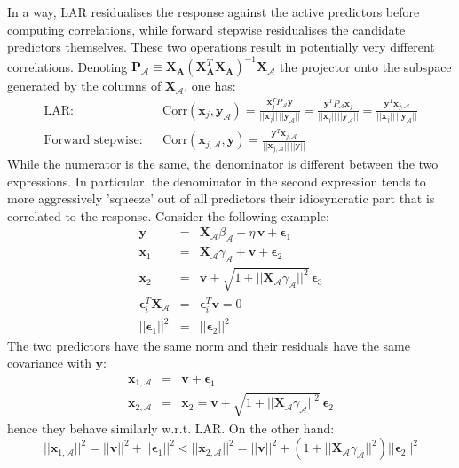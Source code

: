 In a way, LAR residualises the response against the active predictors 
before computing correlations, while forward stepwise residualises the candidate
predictors themselves. These two operations result in potentially very different
correlations. Denoting $\mathbf{P}_\mathcal{A} \equiv \mathbf{X}_\mathbf{A} 
\left(\mathbf{X}_\mathbf{A}^T \mathbf{X}_\mathbf{A}\right)^{-1} 
\mathbf{X}_\mathcal{A}$ the projector onto the subspace generated by the
columns of $\mathbf{X}_\mathcal{A}$, one has:
\begin{eqnarray*}
\textrm{LAR}: & & \textrm{Corr} \left(\mathbf{x}_j, \mathbf{y}_{\mathcal{A}}\right) =
    \frac{\mathbf{x}_j^T P_\mathcal{A} \mathbf{y}}{
        ||\mathbf{x}_j||\,||\mathbf{y}_{\mathcal{A}}||} = 
    \frac{\mathbf{y}^T P_\mathcal{A}\mathbf{x}_j}{
        ||\mathbf{x}_j||\,||\mathbf{y}_{\mathcal{A}}||} = 
    \frac{\mathbf{y}^T \mathbf{x}_{j, \mathcal{A}}}{
        ||\mathbf{x}_j||\,||\mathbf{y}_{\mathcal{A}}||} \\
\textrm{Forward stepwise}: & &
    \textrm{Corr} \left(\mathbf{x}_{j, \mathcal{A}}, \mathbf{y}\right) = 
        \frac{\mathbf{y}^T \mathbf{x}_{j, \mathcal{A}}}{
            ||\mathbf{x}_{j, \mathcal{A}}||\,||\mathbf{y}||}
\end{eqnarray*}
While the numerator is the same, the denominator is different between
the two expressions. In particular, the denominator in the second expression
tends to more aggressively 'squeeze' out of all predictors their idiosyncratic
part that is correlated to the response. Consider the following example:
\begin{eqnarray*}
    \mathbf{y} & = & \mathbf{X}_\mathcal{A} \beta_\mathcal{A} + \eta\, \mathbf{v} + \bm{\epsilon}_1 \\
    \mathbf{x}_1 & = & \mathbf{X}_\mathcal{A} \gamma_\mathcal{A} + \mathbf{v} + \bm{\epsilon}_2 \\
    \mathbf{x}_2 & = & \mathbf{v} + \sqrt{1 + ||\mathbf{X}_\mathcal{A} \gamma_\mathcal{A}||^2}\,\bm{\epsilon}_3 \\
    \bm{\epsilon}_i^T \mathbf{X}_\mathcal{A} & = & \bm{\epsilon}_i^T \mathbf{v} = 0\\
    ||\bm{\epsilon}_1||^2 & = & ||\bm{\epsilon}_2||^2
\end{eqnarray*}
The two predictors have the same norm and their residuals have the same
covariance with $\mathbf{y}$:
\begin{eqnarray*}
    \mathbf{x}_{1, \mathcal{A}} & = & \mathbf{v} + \bm{\epsilon}_1 \\
    \mathbf{x}_{2, \mathcal{A}} & = & \mathbf{x}_{2} = \mathbf{v} + \sqrt{1 + ||\mathbf{X}_\mathcal{A} \gamma_\mathcal{A}||^2}\,\bm{\epsilon}_2
\end{eqnarray*}
hence they behave similarly w.r.t. LAR. On the other hand:
\begin{equation*}
||\mathbf{x}_{1, \mathcal{A}}||^2 = ||\mathbf{v}||^2 + ||\bm{\epsilon}_1||^2 < ||\mathbf{x}_{2, \mathcal{A}}||^2 = ||\mathbf{v}||^2 + \left(1 + ||\mathbf{X}_\mathcal{A} \gamma_\mathcal{A}||^2\right) ||\bm{\epsilon}_2||^2
\end{equation*}
